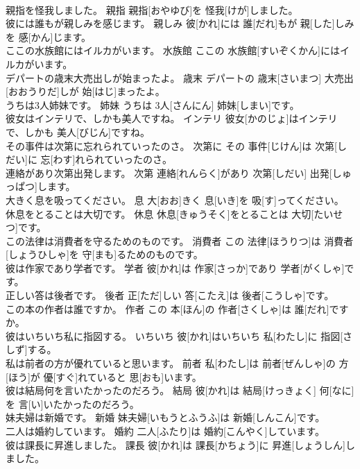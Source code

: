 \documentclass[8pt]{extreport}
\begin{document}
\begin{CJK}{UTF8}{min}
\\	親指を怪我しました。	親指	親指[おやゆび]を 怪我[けが]しました。	
\\	彼には誰もが親しみを感じます。	親しみ	彼[かれ]には 誰[だれ]もが 親[した]しみを 感[かん]じます。	
\\	ここの水族館にはイルカがいます。	水族館	ここの 水族館[すいぞくかん]にはイルカがいます。	
\\	デパートの歳末大売出しが始まったよ。	歳末	デパートの 歳末[さいまつ] 大売出[おおうりだ]しが 始[はじ]まったよ。	
\\	うちは3人姉妹です。	姉妹	うちは 3人[さんにん] 姉妹[しまい]です。	
\\	彼女はインテリで、しかも美人ですね。	インテリ	彼女[かのじょ]はインテリで、しかも 美人[びじん]ですね。	
\\	その事件は次第に忘れられていったのさ。	次第に	その 事件[じけん]は 次第[しだい]に 忘[わす]れられていったのさ。	
\\	連絡があり次第出発します。	次第	連絡[れんらく]があり 次第[しだい] 出発[しゅっぱつ]します。	
\\	大きく息を吸ってください。	息	大[おお]きく 息[いき]を 吸[す]ってください。	
\\	休息をとることは大切です。	休息	休息[きゅうそく]をとることは 大切[たいせつ]です。	
\\	この法律は消費者を守るためのものです。	消費者	この 法律[ほうりつ]は 消費者[しょうひしゃ]を 守[まも]るためのものです。	
\\	彼は作家であり学者です。	学者	彼[かれ]は 作家[さっか]であり 学者[がくしゃ]です。	
\\	正しい答は後者です。	後者	正[ただ]しい 答[こたえ]は 後者[こうしゃ]です。	
\\	この本の作者は誰ですか。	作者	この 本[ほん]の 作者[さくしゃ]は 誰[だれ]ですか。	
\\	彼はいちいち私に指図する。	いちいち	彼[かれ]はいちいち 私[わたし]に 指図[さしず]する。	
\\	私は前者の方が優れていると思います。	前者	私[わたし]は 前者[ぜんしゃ]の 方[ほう]が 優[すぐ]れていると 思[おも]います。	
\\	彼は結局何を言いたかったのだろう。	結局	彼[かれ]は 結局[けっきょく] 何[なに]を 言[い]いたかったのだろう。	
\\	妹夫婦は新婚です。	新婚	妹夫婦[いもうとふうふ]は 新婚[しんこん]です。	
\\	二人は婚約しています。	婚約	二人[ふたり]は 婚約[こんやく]しています。	
\\	彼は課長に昇進しました。	課長	彼[かれ]は 課長[かちょう]に 昇進[しょうしん]しました。	

\end{CJK}
\end{document}
